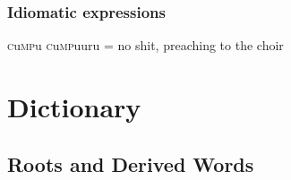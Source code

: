 \documentclass[a4paper,10pt,twoside,openright]{memoir}
\newcommand{\famword}[5]{#1\textsc{#2}#3\textsc{#4}#5}
\begin{document}
\section{Idiomatic expressions}

\famword{}{c}{u}{mp}{u} \famword{}{c}{u}{mp}{uuru} = no shit, preaching to the choir

\part{Dictionary}

\newcommand{\newentry}[2]{\item[#1] $\bullet$ \textit{#2}\hfill}


\chapter{Roots and Derived Words}
\end{document}
